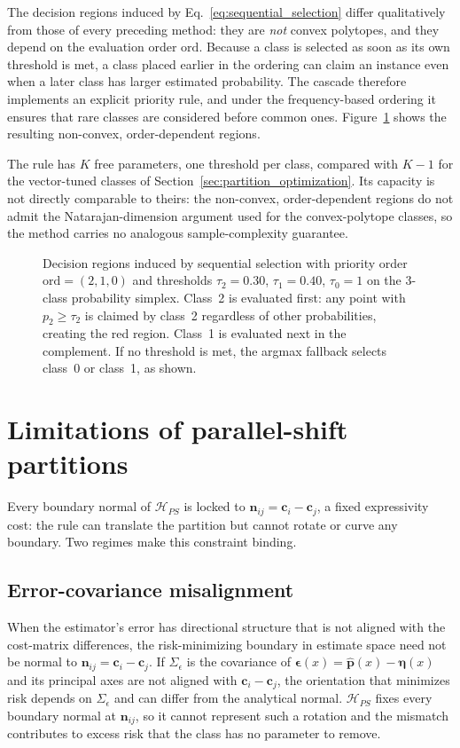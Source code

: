 The decision regions induced by Eq.~\ref{eq:sequential_selection} differ qualitatively from those of every preceding method: they are \emph{not} convex polytopes, and they depend on the evaluation order $\mathrm{ord}$. Because a class is selected as soon as its own threshold is met, a class placed earlier in the ordering can claim an instance even when a later class has larger estimated probability. The cascade therefore implements an explicit priority rule, and under the frequency-based ordering it ensures that rare classes are considered before common ones. Figure~\ref{fig:sequential_selection} shows the resulting non-convex, order-dependent regions.

The rule has $K$ free parameters, one threshold per class, compared with $K-1$ for the vector-tuned classes of Section~\ref{sec:partition_optimization}. Its capacity is not directly comparable to theirs: the non-convex, order-dependent regions do not admit the Natarajan-dimension argument used for the convex-polytope classes, so the method carries no analogous sample-complexity guarantee.

\begin{figure}[H]
    \centering
    
    \caption{Decision regions induced by sequential selection with priority order $\mathrm{ord} = (2, 1, 0)$ and thresholds $\tau_2 = 0.30$, $\tau_1 = 0.40$, $\tau_0 = 1$ on the 3-class probability simplex. Class~2 is evaluated first: any point with $p_2 \ge \tau_2$ is claimed by class~2 regardless of other probabilities, creating the red region. Class~1 is evaluated next in the complement. If no threshold is met, the argmax fallback selects class~0 or class~1, as shown.}\label{fig:sequential_selection}
\end{figure}

\section{Limitations of parallel-shift partitions}

Every boundary normal of $\mathcal{H}_{PS}$ is locked to $\mathbf{n}_{ij} = \mathbf{c}_i - \mathbf{c}_j$, a fixed expressivity cost: the rule can translate the partition but cannot rotate or curve any boundary. Two regimes make this constraint binding.

\subsection{Error-covariance misalignment}
When the estimator's error has directional structure that is not aligned with the cost-matrix differences, the risk-minimizing boundary in estimate space need not be normal to $\mathbf{n}_{ij} = \mathbf{c}_i - \mathbf{c}_j$. If $\Sigma_\epsilon$ is the covariance of $\boldsymbol{\epsilon}(x) = \hat{\mathbf{p}}(x) - \boldsymbol{\eta}(x)$ and its principal axes are not aligned with $\mathbf{c}_i - \mathbf{c}_j$, the orientation that minimizes risk depends on $\Sigma_\epsilon$ and can differ from the analytical normal. $\mathcal{H}_{PS}$ fixes every boundary normal at $\mathbf{n}_{ij}$, so it cannot represent such a rotation and the mismatch contributes to excess risk that the class has no parameter to remove.

